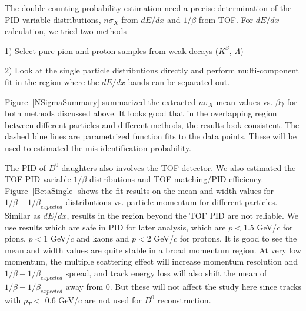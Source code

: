 \documentclass[a4paper]{article}
\begin{document}
The double counting probability estimation need a precise determination of the PID variable distributions, $n\sigma_X$ from $dE/dx$ and $1/\beta$ from TOF. For $dE/dx$ calculation, we tried two methods

1) Select pure pion and proton samples from weak decays ($K^{S}$, $\Lambda$)

2) Look at the single particle distributions directly and perform multi-component fit in the region where the $dE/dx$ bands can be separated out.

Figure~\ref{NSigmaSummary} summarized the extracted $n\sigma_{X}$ mean values vs. $\beta\gamma$ for both methods discussed above. It looks good that in the overlapping region between different particles and different methods, the results look consistent. The dashed blue lines are parametrized function fits to the data points. These will be used to estimated the mis-identification probability.

\begin{figure}
\end{figure}

The PID of $D^0$ daughters also involves the TOF detector. We also estimated the TOF PID variable $1/\beta$ distributions and TOF matching/PID efficiency. Figure~\ref{BetaSingle} shows the fit results on the mean and width values for $1/\beta-1/\beta_{expected}$ distributions vs. particle momentum for different particles. Similar as $dE/dx$, results in the region beyond the TOF PID are not reliable. We use results which are safe in PID for later analysis, which are $p<1.5$ GeV/$c$ for pions, $p<1$ GeV/$c$ and kaons and $p<2$ GeV/$c$ for protons. It is good to see the mean and width values are quite stable in a broad momentum region. At very low momentum, the multiple scattering effect will increase momentum resolution and $1/\beta-1/\beta_{expected}$ spread, and track energy loss will also shift the mean of $1/\beta-1/\beta_{expected}$ away from 0. But these will not affect the study here since tracks with $p_T < $ 0.6 GeV/c are not used for $D^0$ reconstruction. 
\end{document}
